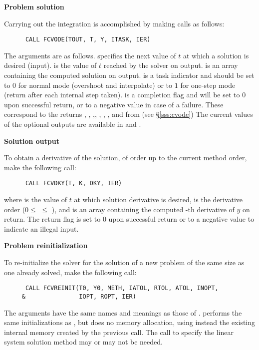 \begin{Steps}
\item {\bf Problem solution}

  Carrying out the integration is accomplished by making calls as follows:
\begin{verbatim}
      CALL FCVODE(TOUT, T, Y, ITASK, IER)
\end{verbatim}
  The arguments are as follows.
   specifies the next value of $t$ at which a solution is desired (input).
   is the value of $t$ reached by the solver on output.
   is an array containing the computed solution on output.
   is a task indicator and should be set to $0$ for normal mode 
  (overshoot  and interpolate) or to $1$ for one-step mode 
  (return after each internal step taken).
   is a completion flag and will be set to $0$ upon successful return, or
  to a negative value in case of a failure.
  These correspond to the returns , ,
  ,, ,
  , , and 
  from  (see \S\ref{sss:cvode}) 
  The current values of the optional outputs are available in  and .
  
\item {\bf Solution output}

  To obtain a derivative of the solution, of order up to the current method
  order, make the following call:
\begin{verbatim}
      CALL FCVDKY(T, K, DKY, IER)
\end{verbatim}
  where
   is the value of $t$ at which solution derivative is desired,
   is the derivative order ($0 \le$  $\le$ ), and
   is an array containing the computed -th derivative of $y$ on return.
  The return flag  is set to $0$ upon successful return or to a negative
  value to indicate an illegal input.
  
\item {\bf Problem reinitialization}

  To re-initialize the {\cvode} solver for the solution of a new problem
  of the same size as one already solved, make the following call:
\begin{verbatim}
      CALL FCVREINIT(T0, Y0, METH, IATOL, RTOL, ATOL, INOPT,
     &               IOPT, ROPT, IER)
\end{verbatim}
  The arguments have the same names and meanings as those of .
   performs the same initializations as
  , but does no memory allocation, using instead the existing
  internal memory created by the previous  call.  The call to
  specify the linear system solution method may or may not be needed.


\end{Steps}
